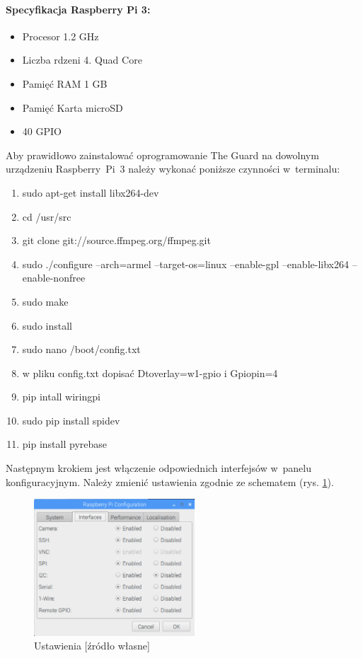 \paragraph{Specyfikacja Raspberry Pi 3:}
\begin{itemize} 
\item Procesor 1.2 GHz
\item Liczba rdzeni 4. Quad Core
\item Pamięć RAM 1 GB
\item Pamięć Karta microSD
\item 40 GPIO
\end{itemize}
Aby prawidłowo zainstalować oprogramowanie The Guard na dowolnym urządzeniu Raspberry~Pi~3 należy wykonać poniższe czynności w~terminalu:
\begin{enumerate} 
\item sudo apt-get install libx264-dev
\item cd /usr/src
\item git clone git://source.ffmpeg.org/ffmpeg.git
\item sudo ./configure --arch=armel --target-os=linux --enable-gpl --enable-libx264 --enable-nonfree
\item sudo make
\item sudo install
\item sudo nano /boot/config.txt
\item w pliku config.txt dopisać Dtoverlay=w1-gpio i Gpiopin=4
\item pip intall wiringpi
\item sudo pip install spidev
\item pip install pyrebase
\end{enumerate}
Następnym krokiem jest włączenie odpowiednich interfejsów w~panelu konfiguracyjnym. Należy zmienić ustawienia zgodnie ze schematem (rys. \ref{rs_settings}).
\begin{figure}[H]
	\centering
	\includegraphics[width=6cm]{RSettings}
	\caption{Ustawienia [źródło własne]}
	\label{rs_settings}
\end{figure}
